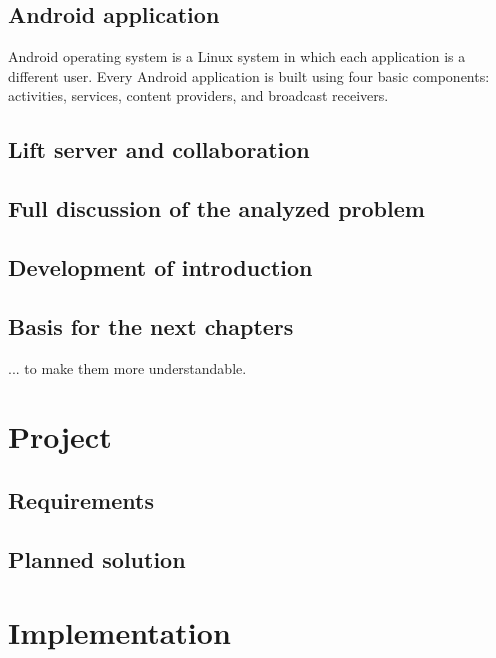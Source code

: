\documentclass[american]{bsc}
\begin{document}
\section{Android application}
\label{androidsdk}
Android operating system is a Linux system in which each application is a different user. Every Android application is built using four basic components: activities, services, content providers, and broadcast receivers. 

\section{Lift server and collaboration}
\label{lift}

\section{Full discussion of the analyzed problem}
\label{sec:fulldisc}

\section{Development of introduction}
\label{sec:introdevelopment}

\section{Basis for the next chapters}
\label{sec:nextchapterbasis}

... to make them more understandable.

\chapter{Project}
\label{chap:project}

\section{Requirements}
\label{sec:requirements}

\section{Planned solution}
\label{sec:plan}

\chapter{Implementation}
\label{chap:implementation}
\end{document}

